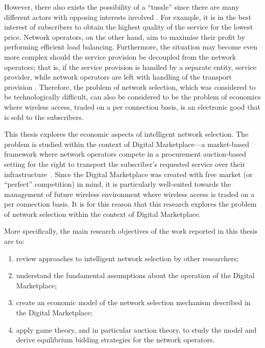 However, there also exists the possibility of a ``tussle'' since there are many different actors with opposing interests involved \cite{Clark02}. For example, it is in the best interest of subscribers to obtain the highest quality of the service for the lowest price. Network operators, on the other hand, aim to maximise their profit by performing efficient load balancing. Furthermore, the situation may become even more complex should the service provision be decoupled from the network operators; that is, if the service provision is handled by a separate entity, service provider, while network operators are left with handling of the transport provision \cite{DMBushTussle09}. Therefore, the problem of network selection, which was considered to be technologically difficult, can also be considered to be the problem of economics where wireless access, traded on a per connection basis, is an electronic good that is sold to the subscribers.

This thesis explores the economic aspects of intelligent network selection. The problem is studied within the context of Digital Marketplace---a market-based framework where network operators compete in a procurement auction-based setting for the right to transport the subscriber's requested service over their infrastructure~\cite{DMLeBodic00}. Since the Digital Marketplace was created with free market (or ``perfect'' competition) in mind, it is particularly well-suited towards the management of future wireless environment where wireless access is traded on a per connection basis. It is for this reason that this research explores the problem of network selection within the context of Digital Marketplace.

More specifically, the main research objectives of the work reported in this thesis are to:
\begin{enumerate}
\item review approaches to intelligent network selection by other researchers;
\item understand the fundamental assumptions about the operation of the Digital Marketplace;
\item create an economic model of the network selection mechanism described in the Digital Marketplace;
\item apply game theory, and in particular auction theory, to study the model and derive equilibrium bidding strategies for the network operators.
\end{enumerate}

